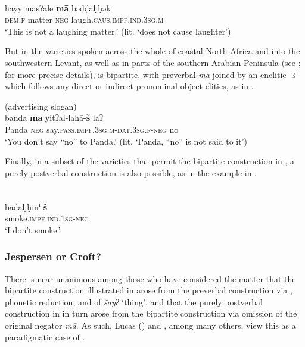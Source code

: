 \documentclass[output=paper]{langsci/langscibook}
\begin{document}
\ea\label{dam}
         \citep[328]{Cowell1964}\\
\gll hayy masʔale \textbf{mā} bəḍḍaḥḥək\\
     \textsc{dem.f} matter \textsc{neg} laugh.\textsc{caus.impf.ind.3sg.m}\\
\glt ‘This is not a laughing matter.’ (lit. ‘does not cause laughter’)
\z

But in the varieties spoken across the whole of coastal North Africa and into the southwestern Levant, as well as in parts of the southern Arabian Peninsula (see \citealt{Diem2014}; \citealt{Lucas2018} for more precise details),  is bipartite, with preverbal \textit{mā} joined by an enclitic \textit{-š} which follows any direct or indirect pronominal object clitics, as in .

\ea\label{cai}
         (advertising slogan)\\
\gll banda \textbf{ma} yitʔal-lahā-\textbf{š} laʔ\\
     Panda \textsc{neg} say.\textsc{pass.impf.3sg.m-dat.3sg.f-neg} no\\
\glt ‘You don’t say “no” to Panda.’ (lit. ‘Panda, “no” is not said to it’)
\z

Finally, in a subset of the varieties that permit the bipartite construction in , a purely postverbal construction is also possible, as in the   example in .

\ea\label{pal}
   \citep[147]{Seeger2013grammar}\\
\gll badaḫḫin\textsuperscript{i}-\textbf{š}\\
     smoke.\textsc{impf.ind.1sg-neg}\\
\glt ‘I don’t smoke.’
\z




\subsubsection{Jespersen or Croft?}\label{sec:jesp}



There is near unanimous  among those who have considered the matter that the bipartite construction illustrated in  arose from the preverbal construction via , phonetic reduction, and  of \textit{šayʔ} ‘thing’, and that the purely postverbal construction in  in turn arose from the bipartite construction via omission of the original negator \textit{mā}. As such, Lucas (\citeyear{Lucas2007,Lucas2009,Lucas2018}) and \citet{Diem2014}, among many others, view this as a paradigmatic case of .
\end{document}
